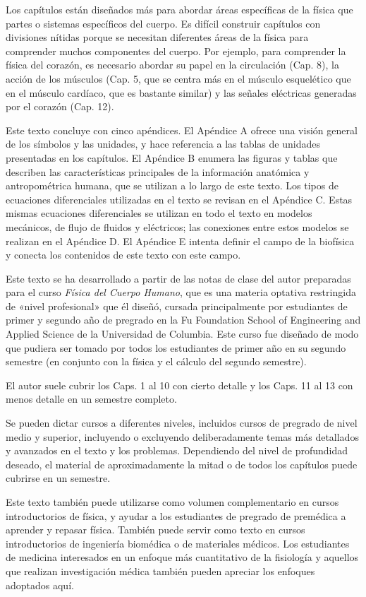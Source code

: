 ﻿\documentclass{book}
\begin{document}
Los capítulos están diseñados más para abordar áreas específicas de la física que partes o sistemas específicos del cuerpo. Es difícil construir capítulos con divisiones nítidas porque se necesitan diferentes áreas de la física para comprender muchos componentes del cuerpo. Por ejemplo, para comprender la física del corazón, es necesario abordar su papel en la circulación (Cap. 8), la acción de los músculos (Cap. 5, que se centra más en el músculo esquelético que en el músculo cardíaco, que es bastante similar) y las señales eléctricas generadas por el corazón (Cap. 12).

Este texto concluye con cinco apéndices. El Apéndice A ofrece una visión general de los símbolos y las unidades, y hace referencia a las tablas de unidades presentadas en los capítulos. El Apéndice B enumera las figuras y tablas que describen las características principales de la información anatómica y antropométrica humana, que se utilizan a lo largo de este texto. Los tipos de ecuaciones diferenciales utilizadas en el texto se revisan en el Apéndice C. Estas mismas ecuaciones diferenciales se utilizan en todo el texto en modelos mecánicos, de flujo de fluidos y eléctricos; las conexiones entre estos modelos se realizan en el Apéndice D. El Apéndice E intenta definir el campo de la biofísica y conecta los contenidos de este texto con este campo.

Este texto se ha desarrollado a partir de las notas de clase del autor preparadas para el curso \textit{Física del Cuerpo Humano}, que es una materia optativa restringida de «nivel profesional» que él diseñó, cursada principalmente por estudiantes de primer y segundo año de pregrado en la Fu Foundation School of Engineering and Applied Science de la Universidad de Columbia. Este curso fue diseñado de modo que pudiera ser tomado por todos los estudiantes de primer año en su segundo semestre (en conjunto con la física y el cálculo del segundo semestre).

El autor suele cubrir los Caps. 1 al 10 con cierto detalle y los Caps. 11 al 13 con menos detalle en un semestre completo.

Se pueden dictar cursos a diferentes niveles, incluidos cursos de pregrado de nivel medio y superior, incluyendo o excluyendo deliberadamente temas más detallados y avanzados en el texto y los problemas. Dependiendo del nivel de profundidad deseado, el material de aproximadamente la mitad o de todos los capítulos puede cubrirse en un semestre.

Este texto también puede utilizarse como volumen complementario en cursos introductorios de física, y ayudar a los estudiantes de pregrado de premédica a aprender y repasar física. También puede servir como texto en cursos introductorios de ingeniería biomédica o de materiales médicos. Los estudiantes de medicina interesados en un enfoque más cuantitativo de la fisiología y aquellos que realizan investigación médica también pueden apreciar los enfoques adoptados aquí.
\end{document}
